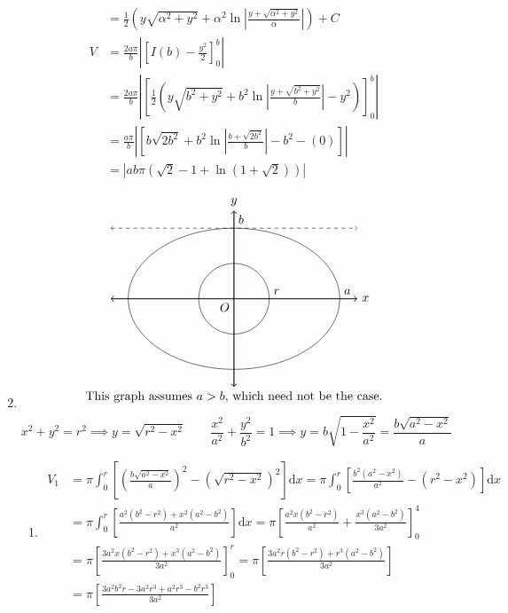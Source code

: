 \documentclass[12pt, A4]{report}
\renewcommand{\d}{\text{d}}
\begin{document}
\begin{enumerate}
\begin{align*}
							&= \frac{1}{2}\left(y\sqrt{\alpha^2 + y^2} + \alpha^2\ln\left|\frac{y + \sqrt{\alpha^2 + y^2}}{\alpha}\right|\right) + C \\
						V &= \frac{2a\pi}{b}\left|\left[I(b) - \frac{y^2}{2}\right]_0^b\right| \\
							&= \frac{2a\pi}{b}\left|\left[\frac{1}{2}\left(y\sqrt{b^2 + y^2} + b^2\ln\left|\frac{y + \sqrt{b^2 + y^2}}{b}\right| - y^2\right)\right]_0^b\right| \\
							&= \frac{a\pi}{b}\left|\left[b\sqrt{2b^2} + b^2\ln\left|\frac{b + \sqrt{2b^2}}{b}\right| - b^2 - (0)\right]\right| \\
							&= \left|ab\pi\left(\sqrt{2} - 1 + \ln\left(1 + \sqrt{2}\right)\right)\right|
					\end{align*}
				\item
					\[\begin{tikzpicture}
						\draw[thick, <->] (-3.5, 0) -- (3.5, 0) node[anchor = west]{$x$};
						\draw[thick, <->] (0, -2.5) -- (0, 2.5) node[anchor = south]{$y$};
							\node[anchor = north east]{$O$};
						\draw[] circle[radius = 1];
							\node[anchor = south west] at (1, 0) {$r$};
						\draw[] ellipse(3cm and 2cm);
							\node[anchor = south west] at (0, 2) {$b$};
							\node[anchor = south west] at (3, 0) {$a$};
						\draw[dashed, <->] (-3.5, 2) -- (3.5, 2);
						\node[anchor = north] at (0, -2.5) {This graph assumes $a > b$, which need not be the case.};
					\end{tikzpicture}\]
					\[
						x^2 + y^2 = r^2 
								\implies y = \sqrt{r^2 - x^2} \qquad
								\frac{x^2}{a^2} + \frac{y^2}{b^2} = 1 
									\implies y = b\sqrt{1 - \frac{x^2}{a^2}} = \frac{b\sqrt{a^2 - x^2}}{a}
					\]
					\begin{enumerate}
						\item
							\begin{align*}
								V_1 &= \pi\int_0^r\left[\left(\frac{b\sqrt{a^2 - x^2}}{a}\right)^2 - \left(\sqrt{r^2 - x^2}\right)^2\right]\d x
										= \pi\int_0^r\left[\frac{b^2(a^2 - x^2)}{a^2} - (r^2 - x^2)\right]\d x \\
									&= \pi\int_0^r\left[\frac{a^2(b^2 - r^2) + x^2(a^2 - b^2)}{a^2}\right]\d x 
										= \pi\left[\frac{a^2x(b^2 - r^2)}{a^2} + \frac{x^3(a^2 - b^2)}{3a^2}\right]_0^4 \\
									&= \pi\left[\frac{3a^2x(b^2 - r^2) + x^3(a^2 - b^2)}{3a^2}\right]_0^r
										= \pi\left[\frac{3a^2r(b^2 - r^2) + r^3(a^2 - b^2)}{3a^2}\right] \\
									&= \pi\left[\frac{3a^2b^2r - 3a^2r^3 + a^2r^3 - b^2r^3}{3a^2}\right]

\end{align*}
\end{enumerate}
\end{enumerate}
\end{document}
